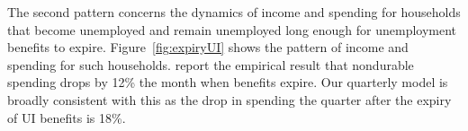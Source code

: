 \documentclass{econsocart}
\begin{document}
\whenintegrated{\label{ganong-noel}}

The second pattern concerns the dynamics of income and spending for households that become unemployed and remain unemployed long enough for unemployment benefits to expire.
Figure~\ref{fig:expiryUI} shows the pattern of income and spending for such households.
\cite{ganongConsumer2019} report the empirical result that nondurable spending drops by 12\% the month when benefits expire.
Our quarterly model is broadly consistent with this as the drop in spending the quarter after the expiry of UI benefits is 18\%.


\smartbib
\end{document}

